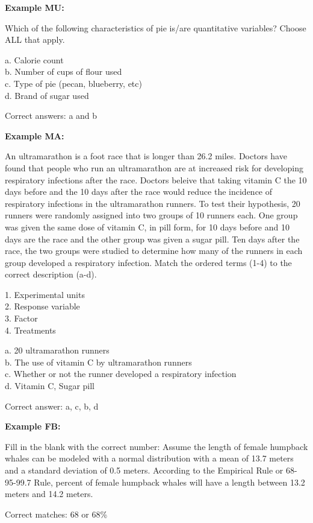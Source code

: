 \documentclass{article}\usepackage[]{graphicx}\usepackage[]{color}
\numberwithin{equation}{section} %
\begin{document}
\begin{framed}
\textbf{Example MU:}

Which of the following characteristics of pie is/are quantitative variables? Choose ALL that apply.

a. Calorie count\\
b. Number of cups of flour used\\
c. Type of pie (pecan, blueberry, etc)\\
d. Brand of sugar used

Correct answers: a and b
\end{framed}

\begin{framed}
\textbf{Example MA:}

An ultramarathon is a foot race that is longer than 26.2 miles. Doctors have found that people who run an ultramarathon are at increased risk for developing respiratory infections after the race. Doctors beleive that taking vitamin C the 10 days before and the 10 days after the race would reduce the incidence of respiratory infections in the ultramarathon runners. To test their hypothesis, 20 runners were randomly assigned into two groups of 10 runners each. One group was given the same dose of vitamin C, in pill form, for 10 days before and 10 days are the race and the other group was given a sugar pill. Ten days after the race, the two groups were studied to determine how many of the runners in each group developed a respiratory infection. Match the ordered terms (1-4) to the correct description (a-d).

1. Experimental units\\
2. Response variable\\
3. Factor\\
4. Treatments

a. 20 ultramarathon runners\\
b. The use of vitamin C by ultramarathon runners\\
c. Whether or not the runner developed a respiratory infection\\
d. Vitamin C, Sugar pill

Correct answer: a, c, b, d
\end{framed}

\begin{framed}
\textbf{Example FB:}

Fill in the blank with the correct number: Assume the length of female humpback whales can be modeled with a normal distribution with a mean of 13.7 meters and a standard deviation of 0.5 meters. According to the Empirical Rule or 68-95-99.7 Rule, \underline{\hspace{2cm}} percent of female humpback whales will have a length between 13.2 meters and 14.2 meters.

Correct matches: 68 or 68\%
\end{framed}
\end{document}
